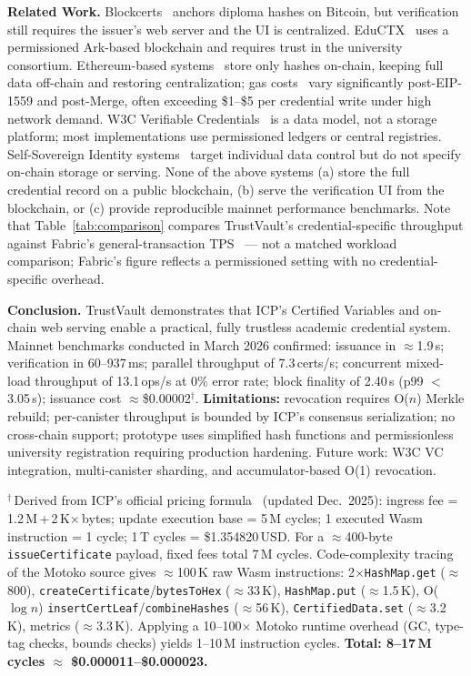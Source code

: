\documentclass[conference,a4paper]{IEEEtran}
\begin{document}
\textbf{Related Work.} Blockcerts~\cite{grech2017blockchain} anchors diploma hashes on Bitcoin, but verification still requires the issuer's web server and the UI is centralized. EduCTX~\cite{turk2018eductx} uses a permissioned Ark-based blockchain and requires trust in the university consortium. Ethereum-based systems~\cite{lizcano2020blockchain} store only hashes on-chain, keeping full data off-chain and restoring centralization; gas costs~\cite{wood2014ethereum} vary significantly post-EIP-1559 and post-Merge, often exceeding \$1--\$5 per credential write under high network demand. W3C Verifiable Credentials~\cite{w3c2022vc} is a data model, not a storage platform; most implementations use permissioned ledgers or central registries. Self-Sovereign Identity systems~\cite{allen2016decentralized} target individual data control but do not specify on-chain storage or serving. None of the above systems (a) store the full credential record on a public blockchain, (b) serve the verification UI from the blockchain, or (c) provide reproducible mainnet performance benchmarks. Note that Table~\ref{tab:comparison} compares TrustVault's credential-specific throughput against Fabric's general-transaction TPS~\cite{androulaki2018fabric} — not a matched workload comparison; Fabric's figure reflects a permissioned setting with no credential-specific overhead.

\textbf{Conclusion.} TrustVault demonstrates that ICP's Certified Variables and on-chain web serving enable a practical, fully trustless academic credential system. Mainnet benchmarks conducted in March 2026 confirmed: issuance in $\approx$1.9\,s; verification in 60--937\,ms; parallel throughput of 7.3\,certs/s; concurrent mixed-load throughput of 13.1\,ops/s at 0\% error rate; block finality of 2.40\,s (p99 $<$ 3.05\,s); issuance cost $\approx$\$0.00002$^\dagger$. \textbf{Limitations:} revocation requires O($n$) Merkle rebuild; per-canister throughput is bounded by ICP's consensus serialization; no cross-chain support; prototype uses simplified hash functions and permissionless university registration requiring production hardening. Future work: W3C VC integration, multi-canister sharding, and accumulator-based O(1) revocation.

\smallskip
{\scriptsize $^\dagger$\,Derived from ICP's official pricing formula~\cite{dfinity2025gascost} (updated Dec.\ 2025): ingress fee = 1.2\,M\,+\,2\,K$\times$\,bytes; update execution base = 5\,M cycles; 1 executed Wasm instruction = 1 cycle; 1\,T cycles = \$1.354820\,USD. For a $\approx$400-byte \texttt{issueCertificate} payload, fixed fees total 7\,M cycles. Code-complexity tracing of the Motoko source gives $\approx$100\,K raw Wasm instructions: 2$\times$\texttt{HashMap.get} ($\approx$800), \texttt{createCertificate}/\texttt{bytesToHex} ($\approx$33\,K), \texttt{HashMap.put} ($\approx$1.5\,K), O($\log n$) \texttt{insertCertLeaf}/\texttt{combineHashes} ($\approx$56\,K), \texttt{CertifiedData.set} ($\approx$3.2\,K), metrics ($\approx$3.3\,K). Applying a 10--100$\times$ Motoko runtime overhead (GC, type-tag checks, bounds checks) yields 1--10\,M instruction cycles. \textbf{Total: 8--17\,M cycles $\approx$ \$0.000011--\$0.000023.}}
\end{document}

